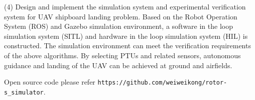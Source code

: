 \begin{eabstract}
(4) Design and implement the simulation system and experimental verification system for UAV shipboard landing problem. Based on the Robot Operation System (ROS) and Gazebo simulation environment, a software in the loop simulation system (SITL) and hardware in the loop simulation system (HIL) is constructed. The simulation environment can meet the verification requirements of the above algorithms. By selecting PTUs and related sensors, autonomous guidance and landing of the UAV can be achieved at ground and airfields.

Open source code please refer \texttt{https://github.com/weiweikong/rotor-s\_simulator}.
 
 
\end{eabstract}

